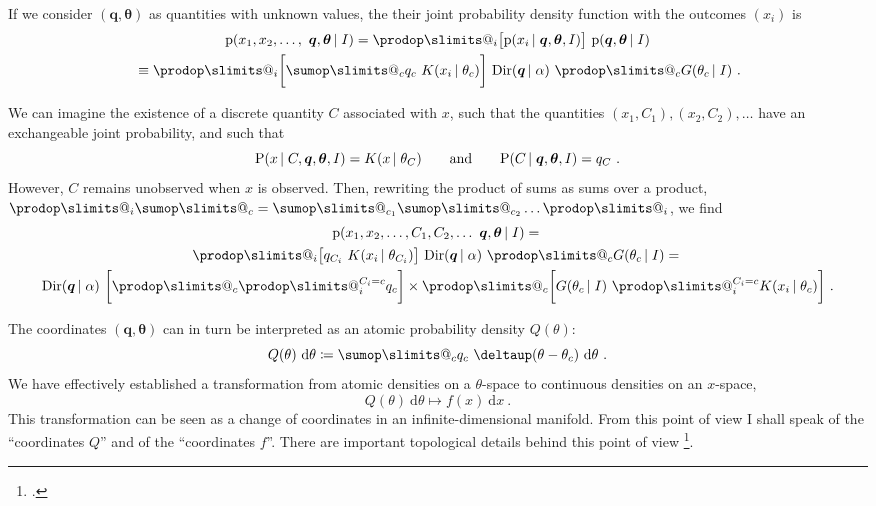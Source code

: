 \documentclass[\ifafour a4paper,12pt,\else a5paper,10pt,\fi%
onecolumn,oneside,article,%
british%
]{memoir}
\makeatletter
\theoremstyle{remark}
\theoremstyle{innote}
\def\sum{\DOTSI\sumop\slimits@}
\def\prod{\DOTSI\prodop\slimits@}
\newcommand*{\mathte}[1]{\textbf{\textit{\textsf{#1}}}}
\newcommand*{\citep}{\footcites}
\newcommand*{\delt}{\deltaup}%
\newcommand*{\di}{\mathrm{d}}%
\newcommand*{\defd}{\coloneqq}
\newcommand*{\pf}{\mathrm{p}}%
\newcommand*{\p}{\mathrm{P}}%
\renewcommand*{\|}[1][]{\nonscript\,#1\vert\nonscript\;\mathopen{}}
\newcommand*{\eq}{\mathrel{\!=\!}}
\renewcommand*{\=}{\TextOrMath\texteq\eq}
\newcommand*{\eg}{{e.g.}}
\newcommand*{\yf}{f}
\newcommand*{\yx}{x}
\newcommand*{\yN}{K}
\newcommand*{\ymu}{\bm{m}}
\newcommand*{\ysi}{\mathte{S}}
\newcommand*{\yq}{\bm{q}}
\newcommand*{\ytheta}{\bm{\theta}}
\newcommand*{\yQ}{Q}
\newcommand*{\yD}{\mathrm{Dir}}
\makeatother
\begin{document}
If we consider $(\yq, \ytheta)$ as quantities with unknown values, the
their joint probability density function with the outcomes $(x_{i})$ is
\begin{multline}
  \label{eq:definetti_joint}
  \pf(\yx_{1},\yx_{2},\dotsc,\ \yq, \ytheta \| I) =
  \prod_{i} \bigl[ \pf(\yx_{i} \| \yq, \ytheta, I)\bigr] \
  \pf(\yq, \ytheta \| I)
  \\
{}\equiv \prod_{i} \biggl[
\sum_{c} q_{c}\ \yN(\yx_{i} \| \theta_{c})
\biggr] \
 \yD(\yq \| \alpha)\ \prod_{c} G(\theta_{c} \| I) \ .
\end{multline}

We can imagine the existence of a discrete quantity $C$ associated with
$\yx$, such that the quantities $(\yx_{1}, C_{1}), (\yx_{2}, C_{2}), \dotsc$ have
an exchangeable joint probability, and such that
\begin{equation}
  \label{eq:prob_given_occupation}
  \p(\yx \| C, \yq, \ytheta, I) = \yN(\yx \| \theta_{C})
  \qquad\text{and}\qquad
  \p(C \| \yq, \ytheta, I) = q_{C} \ .
\end{equation}
However, $C$ remains unobserved when $\yx$ is observed. Then, rewriting the
product of sums as sums over a product, $\prod_{i} \sum_{c} =
\sum_{c_{1}}\sum_{c_{2}}\dotso \prod_{i}$, we find
\begin{multline}
  \label{eq:definetti_joint_occupation}
  \pf(\yx_{1},\yx_{2},\dotsc, C_{1}, C_{2}, \dotsc\ \yq, \ytheta \| I) ={}\\
 \prod_{i} \bigl[
q_{C_{i}}\ \yN(\yx_{i} \| \theta_{C_{i}})
\bigr] \
\yD(\yq \| \alpha)\ \prod_{c} G(\theta_{c} \| I) ={}\\
\yD(\yq \| \alpha)\ 
\biggl[\prod_{c} \prod_{i}^{C_{i} = c} q_{c} \biggr]
\times
\prod_{c}
\biggl[
 G(\theta_{c} \| I)\ 
\prod_{i}^{C_{i} = c}
\yN(\yx_{i} \| \theta_{c})
\biggr] \ .
\end{multline}




\bigskip

The coordinates $(\yq, \ytheta)$ can in turn be interpreted as an atomic
probability density $\yQ(\theta)$:
\begin{equation}
  \label{eq:coords_as_distribution}
  \yQ(\theta)
  \ \di\theta \defd
  \sum_{c} q_{c}\ \delt(\theta-\theta_{c})
  \ \di\theta\ .
\end{equation}
We have effectively established a transformation from atomic densities on a
$\theta$-space to continuous densities on an $\yx$-space,
\begin{equation}
  \label{eq:corresp_densities}
  \yQ(\theta)
  \ \di\theta \mapsto \yf(\yx)\ \di\yx \ .
\end{equation}
This transformation can be seen as a change of coordinates in an
infinite-dimensional manifold. From this point of view I shall speak of the
\enquote{coordinates $\yQ$} and of the \enquote{coordinates $\yf$}. There
are important topological details behind this point of view \citep[See
\eg][]{antoniak1974}.
\end{document}
